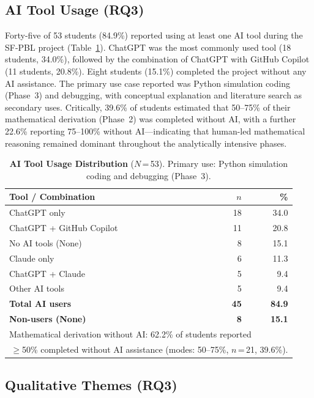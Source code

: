 \documentclass[utf8]{FrontiersinHarvard}
\begin{document}
\subsection{AI Tool Usage (RQ3)}

Forty-five of 53 students (84.9\%) reported using at least one AI tool
during the SF-PBL project (Table~\ref{tab:ai}). ChatGPT was the most
commonly used tool (18 students, 34.0\%), followed by the combination of
ChatGPT with GitHub Copilot (11 students, 20.8\%). Eight students (15.1\%)
completed the project without any AI assistance. The primary use case
reported was Python simulation coding (Phase~3) and debugging, with
conceptual explanation and literature search as secondary uses. Critically,
39.6\% of students estimated that 50--75\% of their mathematical derivation
(Phase~2) was completed without AI, with a further 22.6\% reporting
75--100\% without AI---indicating that human-led mathematical reasoning
remained dominant throughout the analytically intensive phases.

\begin{table}[h]
\caption{\textbf{AI Tool Usage Distribution} ($N$\,=\,53). Primary use:
Python simulation coding and debugging (Phase~3).}
\label{tab:ai}
\begin{tabular}{lrr}
\toprule
\textbf{Tool / Combination} & $n$ & \textbf{\%} \\
\midrule
ChatGPT only                    & 18 & 34.0 \\
ChatGPT + GitHub Copilot        & 11 & 20.8 \\
No AI tools (None)              &  8 & 15.1 \\
Claude only                     &  6 & 11.3 \\
ChatGPT + Claude                &  5 &  9.4 \\
Other AI tools                  &  5 &  9.4 \\
\midrule
\textbf{Total AI users}         & \textbf{45} & \textbf{84.9} \\
\textbf{Non-users (None)}       & \textbf{8}  & \textbf{15.1} \\
\bottomrule
\multicolumn{3}{l}{\small Mathematical derivation without AI: 62.2\% of students reported} \\
\multicolumn{3}{l}{\small \,$\geq$50\% completed without AI assistance (modes: 50--75\%, $n$\,=\,21, 39.6\%).}
\end{tabular}
\end{table}

\subsection{Qualitative Themes (RQ3)}
\end{document}
